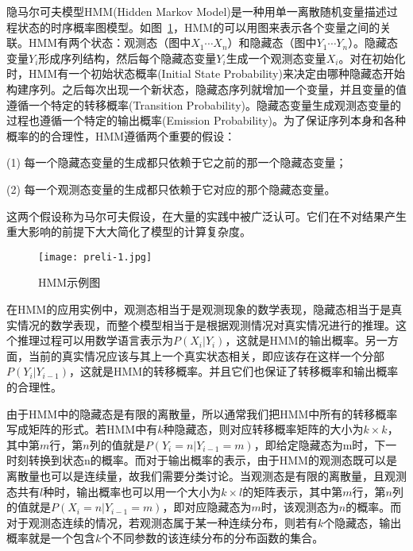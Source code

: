 隐马尔可夫模型HMM(Hidden Markov Model)是一种用单一离散随机变量描述过程状态的时序概率图模型。如图~\ref{fig:hmm}，HMM的可以用图来表示各个变量之间的关联。HMM有两个状态：观测态（图中$X_1 \cdots X_n$）和隐藏态（图中$Y_1 \cdots Y_n$）。隐藏态变量$Y_i$形成序列结构，然后每个隐藏态变量$Y_i$生成一个观测态变量$X_i$。对在初始化时，HMM有一个初始状态概率(Initial State Probability)来决定由哪种隐藏态开始构建序列。之后每次出现一个新状态，隐藏态序列就增加一个变量，并且变量的值遵循一个特定的转移概率(Transition Probability)。隐藏态变量生成观测态变量的过程也遵循一个特定的输出概率(Emission Probability)。为了保证序列本身和各种概率的的合理性，HMM遵循两个重要的假设：
\begin{enumerate*}		
	\item[(1)] 每一个隐藏态变量的生成都只依赖于它之前的那一个隐藏态变量；
	\item[(2)] 每一个观测态变量的生成都只依赖于它对应的那个隐藏态变量。
\end{enumerate*}
这两个假设称为马尔可夫假设，在大量的实践中被广泛认可。它们在不对结果产生重大影响的前提下大大简化了模型的计算复杂度。

\begin{figure}[htbp]
	\centering
	\begin{minipage}[htbp]{\textwidth}
		\centering
		\texttt{[image: preli-1.jpg]}
		\caption[HMM示例图]
		{HMM示例图\label{fig:hmm}}		
	\end{minipage}     
\end{figure}


在HMM的应用实例中，观测态相当于是观测现象的数学表现，隐藏态相当于是真实情况的数学表现，而整个模型相当于是根据观测情况对真实情况进行的推理。这个推理过程可以用数学语言表示为$P(X_i |Y_i)$，这就是HMM的输出概率。另一方面，当前的真实情况应该与其上一个真实状态相关，即应该存在这样一个分部$P(Y_i | Y_{i-1})$，这就是HMM的转移概率。并且它们也保证了转移概率和输出概率的合理性。


由于HMM中的隐藏态是有限的离散量，所以通常我们把HMM中所有的转移概率写成矩阵的形式。若HMM中有$k$种隐藏态，则对应转移概率矩阵的大小为$k \times k$，其中第$m$行，第$n$列的值就是$P(Y_i = n | Y_{i-1} = m)$，即给定隐藏态为m时，下一时刻转换到状态n的概率。而对于输出概率的表示，由于HMM的观测态既可以是离散量也可以是连续量，故我们需要分类讨论。当观测态是有限的离散量，且观测态共有$l$种时，输出概率也可以用一个大小为$k \times l$的矩阵表示，其中第$m$行，第$n$列的值就是$P(X_i = n | Y_{i-1} = m)$，即对应隐藏态为$m$时，该观测态为$n$的概率。而对于观测态连续的情况，若观测态属于某一种连续分布，则若有$k$个隐藏态，输出概率就是一个包含$k$个不同参数的该连续分布的分布函数的集合。


